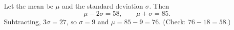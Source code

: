 Let the mean be $\mu$ and the standard deviation $\sigma$. Then
\[
\mu-2\sigma=58,\qquad \mu+\sigma=85 .
\]
Subtracting, $3\sigma=27$, so $\sigma=9$ and $\mu=85-9=\boxed{76}$. (Check: $76-18=58$.)
